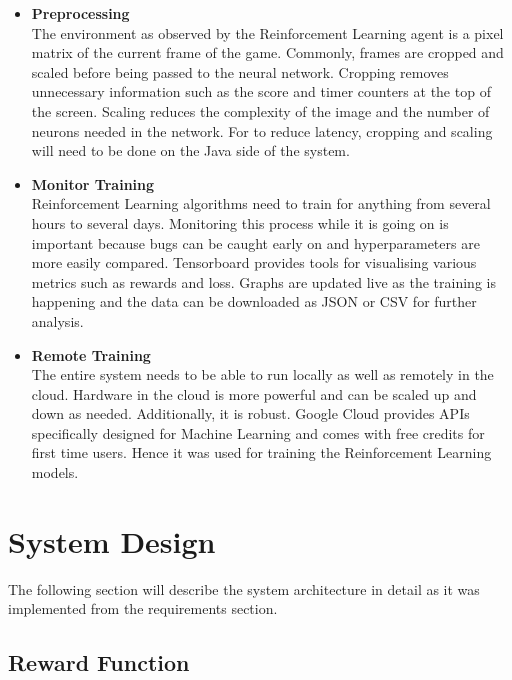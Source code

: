 \documentclass[notitlepage,a4paper,11pt]{article}
\begin{document}
\begin{itemize}
	\item \textbf{Preprocessing}\\
	The environment as observed by the Reinforcement Learning agent is a pixel matrix of the current frame of the game. Commonly, frames are cropped and scaled before being passed to the neural network. Cropping removes unnecessary information such as the score and timer counters at the top of the screen. Scaling reduces the complexity of the image and the number of neurons needed in the network. For to reduce latency, cropping and scaling will need to be done on the Java side of the system.
	
	\item \textbf{Monitor Training}\\
	Reinforcement Learning algorithms need to train for anything from several hours to several days. Monitoring this process while it is going on is important because bugs can be caught early on and hyperparameters are more easily compared. Tensorboard provides tools for visualising various metrics such as rewards and loss. Graphs are updated live as the training is happening and the data can be downloaded as JSON or CSV for further analysis.
	
	\item \textbf{Remote Training}\\
	The entire system needs to be able to run locally as well as remotely in the cloud. Hardware in the cloud is more powerful and can be scaled up and down as needed. Additionally, it is robust. Google Cloud provides APIs specifically designed for Machine Learning and comes with free credits for first time users. Hence it was used for training the Reinforcement Learning models.
	
\end{itemize}

	

\section{System Design}
The following section will describe the system architecture in detail as it was implemented from the requirements section.



\subsection{Reward Function} \label{reward_function}
\end{document}
